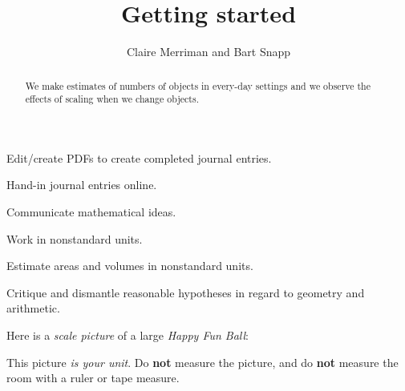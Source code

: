\documentclass[handout,noauthor,nooutcomes,hints,12pt]{ximera}
\title{Getting started}
\author{Claire Merriman and Bart Snapp}
\begin{document}
\begin{abstract}
  We make estimates of numbers of objects in every-day settings and we
  observe the effects of scaling when we change objects.
\end{abstract}
\maketitle


\begin{listOutcomes}
  \item{Edit/create PDFs to create completed journal entries.}
  \item{Hand-in journal entries online.}
  \item{Communicate mathematical ideas.}
  \item{Work in nonstandard units.}
  \item{Estimate areas and volumes in nonstandard units.}
  \item{Critique and dismantle reasonable hypotheses in regard to geometry and
              arithmetic.}
\end{listOutcomes}

Here is a \emph{scale picture} of a large \textit{Happy Fun Ball}:
\begin{center}
\end{center}

This picture \emph{is your unit}.  
Do \textbf{not} measure the picture, and do \textbf{not} measure the room with a ruler or tape measure.



\mynewpage
\end{document}
